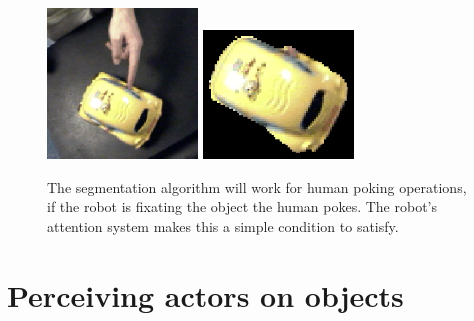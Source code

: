 
\begin{figure}[tbh]
  \centerline{
\includegraphics[width=4cm]{fig-car-hand-seg-src}
\hspace{1cm}
\includegraphics[width=4cm]{fig-car-hand-seg}
}
  \caption{
The segmentation algorithm will work for human poking operations, 
if the robot is fixating the object the human pokes.  The robot's 
attention system makes this a simple condition to satisfy.
}
  \label{fig:hand-poke}
\end{figure}


\section{Perceiving actors on objects}

\label{sect:manipulator}

